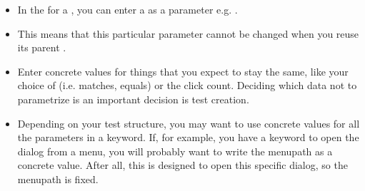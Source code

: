 
\begin{itemize}
\item In the \gdpropview{} for a \gdcase{}, you can enter a  as a parameter e.g. . 
\item This means that this particular parameter cannot be changed when you reuse its parent \gdcase{}. 
\item Enter concrete values for things that you expect to stay the same, like your choice of  (i.e. matches, equals) or the click count. Deciding which data not to parametrize is an important decision is test creation.
\item Depending on your test structure, you may want to use concrete values for all the parameters in a keyword. If, for example, you have a keyword to open the  dialog from a menu, you will probably want to write the menupath as a concrete value. After all, this \gdcase{} is designed to open this specific dialog, so the menupath is fixed. 
\end{itemize}
